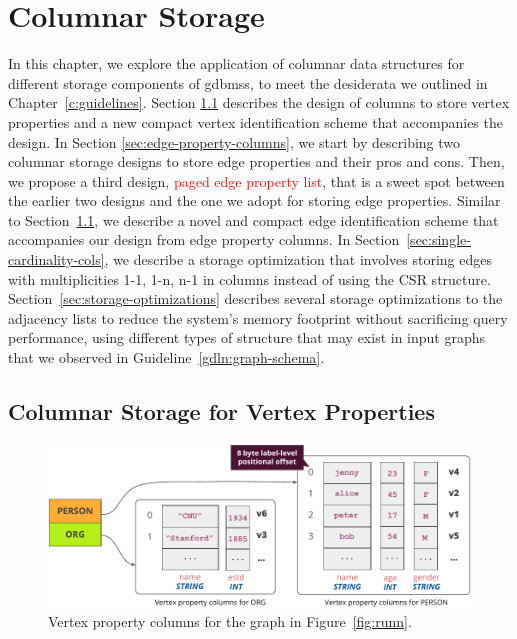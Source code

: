 \chapter{Columnar Storage}
\label{c:columnar-storage}

In this chapter, we explore the application of columnar data structures for different storage components of  \gls{gdbms}s, to meet the desiderata we outlined in Chapter~\ref{c:guidelines}. Section \ref{sec:vertex-property-columns} describes the design of columns to store vertex properties and a new compact vertex identification scheme that accompanies the design. In Section \ref{sec:edge-property-columns}, we start by describing two columnar storage designs to store edge properties and their pros and cons. Then, we propose a third design, \textcolor{red}{paged edge property list}, that is a sweet spot between the earlier two designs and the one we adopt for storing edge properties. Similar to Section~\ref{sec:vertex-property-columns}, we describe a novel and compact edge identification scheme that accompanies our design from edge property columns. In Section~\ref{sec:single-cardinality-cols}, we describe a storage optimization that involves storing edges with multiplicities 1-1, 1-n, n-1 in columns instead of using the CSR structure. Section~\ref{sec:storage-optimizations} describes several storage optimizations to the adjacency lists to reduce the system's memory footprint without sacrificing query performance, using different types of structure that may exist in input graphs that we observed in Guideline~\ref{gdln:graph-schema}.

\section{Columnar Storage for Vertex Properties}
\label{sec:vertex-property-columns}

\begin{figure}
	\hfill\includegraphics[scale=0.85]{img/vpcols}\hspace*{\fill}
	\caption{Vertex property columns for the graph in Figure~\ref{fig:runn}.}
	\label{fig:vpcols}
\end{figure}

